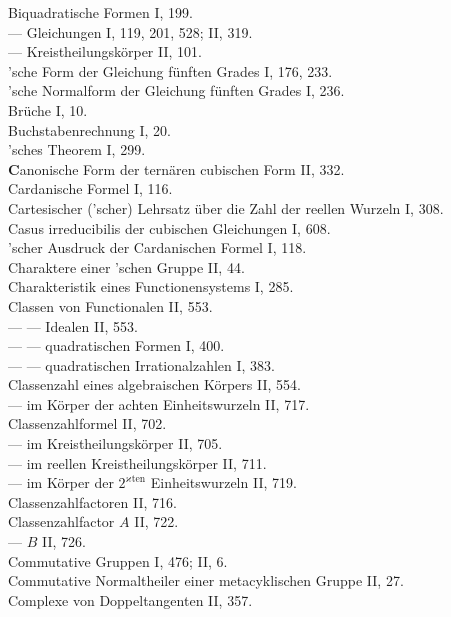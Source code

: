 \noindent
Biquadratische Formen I, 199.\\
--- Gleichungen I, 119, 201, 528; II, 319.\\
--- Kreistheilungsk\"orper II, 101.\\
'sche Form der Gleichung f\"unften Grades I, 176, 233.\\
'sche Normalform der Gleichung f\"unften Grades I, 236.\\
Br\"uche I, 10.\\
Buchstabenrechnung I, 20.\\
'sches Theorem I, 299.\\

\medskip
\noindent
\textbf{C}anonische Form der tern\"aren cubischen Form II, 332.\\
Cardanische Formel I, 116.\\
Cartesischer ('scher) Lehrsatz \"uber die Zahl der reellen Wurzeln I, 308.\\
Casus irreducibilis der cubischen Gleichungen I, 608.\\
'scher Ausdruck der Cardanischen Formel I, 118.\\
Charaktere einer 'schen Gruppe II, 44.\\
Charakteristik eines Functionensystems I, 285.\\
Classen von Functionalen II, 553.\\
--- --- Idealen II, 553.\\
--- --- quadratischen Formen I, 400.\\
--- --- quadratischen Irrationalzahlen I, 383.\\
Classenzahl eines algebraischen K\"orpers II, 554.\\
--- im K\"orper der achten Einheitswurzeln II, 717.\\
Classenzahlformel II, 702.\\
--- im Kreistheilungsk\"orper II, 705.\\
--- im reellen Kreistheilungsk\"orper II, 711.\\
--- im K\"orper der $2^{\varkappa\text{ten}}$ Einheitswurzeln II, 719.\\
Classenzahlfactoren II, 716.\\
Classenzahlfactor $A$ II, 722.\\
--- $B$ II, 726.\\
Commutative Gruppen I, 476; II, 6.\\
Commutative Normaltheiler einer metacyklischen Gruppe II, 27.\\
Complexe von Doppeltangenten II, 357.\\

